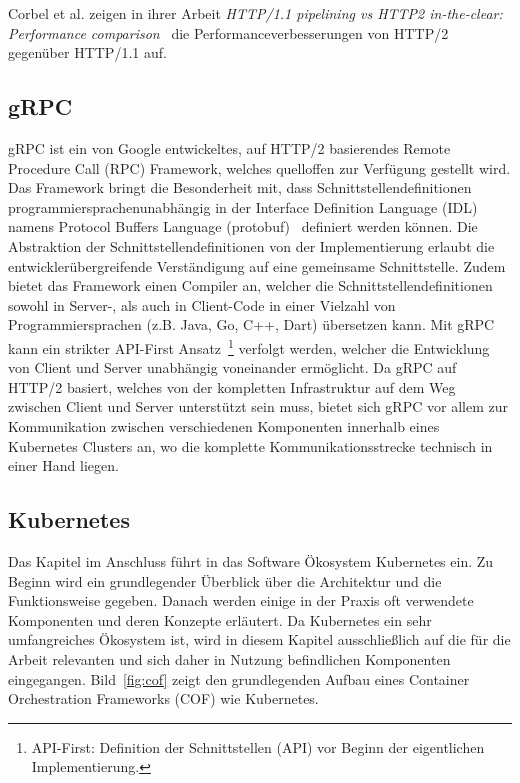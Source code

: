 Corbel et al. zeigen in ihrer Arbeit \textit{HTTP/1.1 pipelining vs HTTP2 in-the-clear: Performance comparison}~\cite{7745823} die Performanceverbesserungen von HTTP/2 gegenüber HTTP/1.1 auf.

\subsection{gRPC}\label{subsec:grpc}
gRPC ist ein von Google entwickeltes, auf HTTP/2 basierendes Remote Procedure Call (RPC) Framework, welches quelloffen zur Verfügung gestellt wird.
Das Framework bringt die Besonderheit mit, dass Schnittstellendefinitionen programmiersprachenunabhängig in der Interface Definition Language (IDL) namens Protocol Buffers Language (protobuf)~\cite{protobuf} definiert werden können.
Die Abstraktion der Schnittstellendefinitionen von der Implementierung erlaubt die entwicklerübergreifende Ver\-stän\-di\-gung auf eine gemeinsame Schnittstelle.
Zudem bietet das Framework einen Compiler an, welcher die Schnittstellendefinitionen sowohl in Server-, als auch in Client-Code in einer Vielzahl von Programmiersprachen (z.B. Java, Go, C++, Dart) übersetzen kann.
Mit gRPC kann ein strikter API-First Ansatz~\footnote{API-First: Definition der Schnittstellen (API) vor Beginn der eigentlichen Implementierung.} verfolgt werden, welcher die Entwicklung von Client und Server unabhängig voneinander ermöglicht.
Da gRPC auf HTTP/2 basiert, welches von der kompletten Infrastruktur auf dem Weg zwischen Client und Server unterstützt sein muss, bietet sich gRPC vor allem zur Kommunikation zwischen verschiedenen Komponenten innerhalb eines Kubernetes Clusters an, wo die komplette Kommunikationsstrecke technisch in einer Hand liegen.

\subsection{Kubernetes}\label{subsec:kubernetes}
Das Kapitel im Anschluss führt in das Software Ökosystem Kubernetes ein.
Zu Beginn wird ein grundlegender Überblick über die Architektur und die Funktionsweise gegeben.
Danach werden einige in der Praxis oft verwendete Komponenten und deren Konzepte erläutert.
Da Kubernetes ein sehr umfangreiches Ökosystem ist, wird in diesem Kapitel ausschließlich auf die für die Arbeit relevanten und sich daher in Nutzung befindlichen Komponenten eingegangen.
Bild~\ref{fig:cof} zeigt den grundlegenden Aufbau eines Container Orchestration Frameworks (COF) wie Kubernetes.

